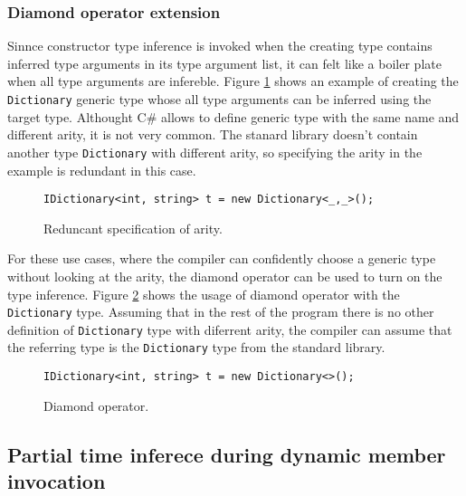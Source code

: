 \subsubsection*{Diamond operator extension}

Sinnce constructor type inference is invoked when the creating type contains inferred type arguments in its type argument list, it can felt like a boiler plate when all type arguments are infereble.
Figure \ref{img57:diamondExample} shows an example of creating the \texttt{Dictionary} generic type whose all type arguments can be inferred using the target type.
Althought C\# allows to define generic type with the same name and different arity, it is not very common.
The stanard library doesn't contain another type \texttt{Dictionary} with different arity, so specifying the arity in the example is redundant in this case.
\begin{figure}[h!]
\begin{lstlisting}[style=csharp, mathescape=true]
IDictionary<int, string> t = new Dictionary<_,_>();
\end{lstlisting}
\caption{Reduncant specification of arity.}
\label{img57:diamondExample}
\end{figure}
\par
For these use cases, where the compiler can confidently choose a generic type without looking at the arity, the diamond operator can be used to turn on the type inference. 
Figure \ref{img58:diamondExample2} shows the usage of diamond operator with the \texttt{Dictionary} type.
Assuming that in the rest of the program there is no other definition of \texttt{Dictionary} type with diferrent arity, the compiler can assume that the referring type is the \texttt{Dictionary} type from the standard library. 
\begin{figure}[h!]
\begin{lstlisting}[style=csharp, mathescape=true]
IDictionary<int, string> t = new Dictionary<>();
\end{lstlisting}
\caption{Diamond operator.}
\label{img58:diamondExample2}
\end{figure}

\subsection{Partial time inferece during dynamic member invocation}

